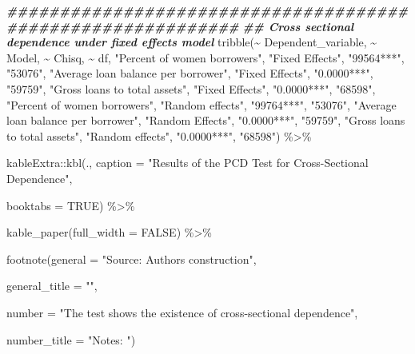 \documentclass[a4paper,nobind]{templates/ociamthesis}
\newenvironment{Shaded}{\begin{snugshade}}{\end{snugshade}}
\newcommand{\AttributeTok}[1]{\textcolor[rgb]{0.77,0.63,0.00}{#1}}
\newcommand{\ConstantTok}[1]{\textcolor[rgb]{0.00,0.00,0.00}{#1}}
\newcommand{\DocumentationTok}[1]{\textcolor[rgb]{0.56,0.35,0.01}{\textbf{\textit{#1}}}}
\newcommand{\FunctionTok}[1]{\textcolor[rgb]{0.00,0.00,0.00}{#1}}
\newcommand{\NormalTok}[1]{#1}
\newcommand{\SpecialCharTok}[1]{\textcolor[rgb]{0.00,0.00,0.00}{#1}}
\newcommand{\StringTok}[1]{\textcolor[rgb]{0.31,0.60,0.02}{#1}}
\renewenvironment{Shaded}
{
  \vspace{10pt}%
  \begin{snugshade}%
}{%
  \end{snugshade}%
  \vspace{8pt}%
}
\begin{document}
\begin{Shaded}
\begin{Highlighting}[]
\DocumentationTok{\#\#\#\#\#\#\#\#\#\#\#\#\#\#\#\#\#\#\#\#\#\#\#\#\#\#\#\#\#\#\#\#\#\#\#\#\#\#\#\#\#\#\#\#\#\#\#\#\#\#\#\#\#\#\#\#\#\#\#\#}
\DocumentationTok{\#\# Cross sectional dependence under fixed effects model}
\FunctionTok{tribble}\NormalTok{(}\SpecialCharTok{\textasciitilde{}}\NormalTok{ Dependent\_variable, }\SpecialCharTok{\textasciitilde{}}\NormalTok{ Model, }\SpecialCharTok{\textasciitilde{}}\NormalTok{ Chisq, }\SpecialCharTok{\textasciitilde{}}\NormalTok{ df,}
        \StringTok{"Percent of women borrowers"}\NormalTok{, }\StringTok{"Fixed Effects"}\NormalTok{, }\StringTok{"99564***"}\NormalTok{, }\StringTok{"53076"}\NormalTok{,}
        \StringTok{"Average loan balance per borrower"}\NormalTok{, }\StringTok{"Fixed Effects"}\NormalTok{, }\StringTok{"0.0000***"}\NormalTok{, }\StringTok{"59759"}\NormalTok{,}
        \StringTok{"Gross loans to total assets"}\NormalTok{, }\StringTok{"Fixed Effects"}\NormalTok{, }\StringTok{"0.0000***"}\NormalTok{, }\StringTok{"68598"}\NormalTok{,}
        \StringTok{"Percent of women borrowers"}\NormalTok{, }\StringTok{"Random effects"}\NormalTok{, }\StringTok{"99764***"}\NormalTok{, }\StringTok{"53076"}\NormalTok{,}
        \StringTok{"Average loan balance per borrower"}\NormalTok{, }\StringTok{"Random Effects"}\NormalTok{, }\StringTok{"0.0000***"}\NormalTok{, }\StringTok{"59759"}\NormalTok{,}
        \StringTok{"Gross loans to total assets"}\NormalTok{, }\StringTok{"Random effects"}\NormalTok{, }\StringTok{"0.0000***"}\NormalTok{, }\StringTok{"68598"}\NormalTok{) }\SpecialCharTok{\%\textgreater{}\%} 

\NormalTok{kableExtra}\SpecialCharTok{::}\FunctionTok{kbl}\NormalTok{(., }\AttributeTok{caption =} \StringTok{"Results of the PCD Test for Cross{-}Sectional Dependence"}\NormalTok{, }
      
  \AttributeTok{booktabs =} \ConstantTok{TRUE}\NormalTok{) }\SpecialCharTok{\%\textgreater{}\%} 
  
  \FunctionTok{kable\_paper}\NormalTok{(}\AttributeTok{full\_width =} \ConstantTok{FALSE}\NormalTok{) }\SpecialCharTok{\%\textgreater{}\%} 
  
  \FunctionTok{footnote}\NormalTok{(}\AttributeTok{general =} \StringTok{"Source: Authors\textquotesingle{} construction"}\NormalTok{,}
           
  \AttributeTok{general\_title =} \StringTok{""}\NormalTok{,}
  
  \AttributeTok{number =} \StringTok{"The test shows the existence of cross{-}sectional dependence"}\NormalTok{,}
  
  \AttributeTok{number\_title =} \StringTok{"Notes: "}\NormalTok{) }
\end{Highlighting}
\end{Shaded}
\end{document}
